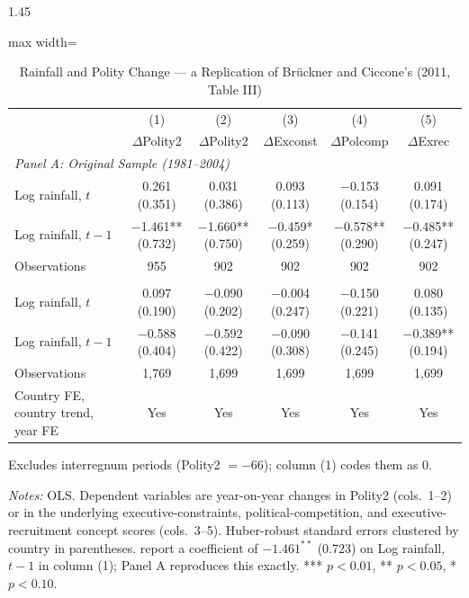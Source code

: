 \documentclass[12pt]{article}
\begin{document}
\begin{bibunit}[jpe]
\begin{spacing}{1.45}
\begin{table}[H]
\centering
\begin{adjustbox}{max width=\textwidth}
\begin{threeparttable}
\caption{Rainfall and Polity Change --- a Replication of Br{\"u}ckner and Ciccone's (2011, Table III)}
\label{tab:A1}
\begin{tabular}{lccccc}
\toprule
 & (1) & (2) & (3) & (4) & (5) \\
 & $\Delta$Polity2 & $\Delta$Polity2\tnote{a} & $\Delta$Exconst & $\Delta$Polcomp & $\Delta$Exrec \\
\midrule
\multicolumn{6}{l}{\textit{Panel A: Original Sample (1981--2004)}} \\
Log rainfall, $t$     & 0.261 (0.351)      & 0.031 (0.386)      & 0.093 (0.113)      & $-$0.153 (0.154)    & 0.091 (0.174) \\
Log rainfall, $t-1$   & $-$1.461** (0.732) & $-$1.660** (0.750) & $-$0.459* (0.259)   & $-$0.578** (0.290)  & $-$0.485** (0.247) \\
Observations           & 955                & 902                & 902                & 902                & 902 \\
\addlinespace
\multicolumn{6}{l}{\textit{Panel B: Extended Sample (1981--2024)}} \\
Log rainfall, $t$     & 0.097 (0.190)      & $-$0.090 (0.202)    & $-$0.004 (0.247)    & $-$0.150 (0.221)    & 0.080 (0.135) \\
Log rainfall, $t-1$   & $-$0.588 (0.404)   & $-$0.592 (0.422)    & $-$0.090 (0.308)    & $-$0.141 (0.245)    & $-$0.389** (0.194) \\
Observations           & 1{,}769            & 1{,}699            & 1{,}699            & 1{,}699            & 1{,}699 \\
\midrule
Country FE, country trend, year FE & Yes & Yes & Yes & Yes & Yes \\
\bottomrule
\end{tabular}
\begin{tablenotes}[flushleft]
\footnotesize
\item[a] Excludes interregnum periods (Polity2 $=-66$); column (1) codes them as 0.
\item \textit{Notes:} OLS. Dependent variables are year-on-year changes in Polity2 (cols.\ 1--2) or in the underlying executive-constraints, political-competition, and executive-recruitment concept scores (cols.\ 3--5). Huber-robust standard errors clustered by country in parentheses. \citet{bruckner2011rain} report a coefficient of $-1.461^{**}$ (0.723) on Log rainfall, $t-1$ in column (1); Panel A reproduces this exactly. *** $p<0.01$, ** $p<0.05$, * $p<0.10$.
\end{tablenotes}
\end{threeparttable}
\end{adjustbox}
\end{table}


\end{spacing}
\end{bibunit}
\end{document}
